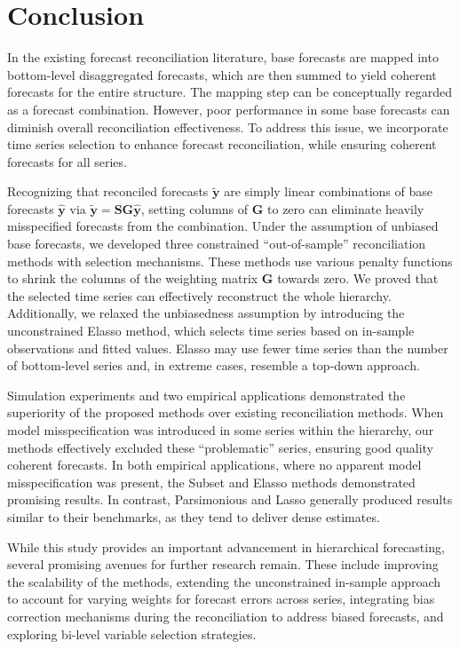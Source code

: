 \documentclass[
  11pt]{article}
\theoremstyle{plain}
\theoremstyle{remark}
\begin{document}
\section{Conclusion}\label{sec-conclusion}

In the existing forecast reconciliation literature, base forecasts are
mapped into bottom-level disaggregated forecasts, which are then summed
to yield coherent forecasts for the entire structure. The mapping step
can be conceptually regarded as a forecast combination. However, poor
performance in some base forecasts can diminish overall reconciliation
effectiveness. To address this issue, we incorporate time series
selection to enhance forecast reconciliation, while ensuring coherent
forecasts for all series.

Recognizing that reconciled forecasts \(\tilde{\bm{y}}\) are simply
linear combinations of base forecasts \(\hat{\bm{y}}\) via
\(\tilde{\bm{y}}=\bm{SG}\hat{\bm{y}}\), setting columns of \(\bm{G}\) to
zero can eliminate heavily misspecified forecasts from the combination.
Under the assumption of unbiased base forecasts, we developed three
constrained ``out-of-sample'' reconciliation methods with selection
mechanisms. These methods use various penalty functions to shrink the
columns of the weighting matrix \(\bm{G}\) towards zero. We proved that
the selected time series can effectively reconstruct the whole
hierarchy. Additionally, we relaxed the unbiasedness assumption by
introducing the unconstrained Elasso method, which selects time series
based on in-sample observations and fitted values. Elasso may use fewer
time series than the number of bottom-level series and, in extreme
cases, resemble a top-down approach.

Simulation experiments and two empirical applications demonstrated the
superiority of the proposed methods over existing reconciliation
methods. When model misspecification was introduced in some series
within the hierarchy, our methods effectively excluded these
``problematic'' series, ensuring good quality coherent forecasts. In
both empirical applications, where no apparent model misspecification
was present, the Subset and Elasso methods demonstrated promising
results. In contrast, Parsimonious and Lasso generally produced results
similar to their benchmarks, as they tend to deliver dense estimates.

While this study provides an important advancement in hierarchical
forecasting, several promising avenues for further research remain.
These include improving the scalability of the methods, extending the
unconstrained in-sample approach to account for varying weights for
forecast errors across series, integrating bias correction mechanisms
during the reconciliation to address biased
forecasts,
and exploring bi-level variable selection strategies.
\end{document}

